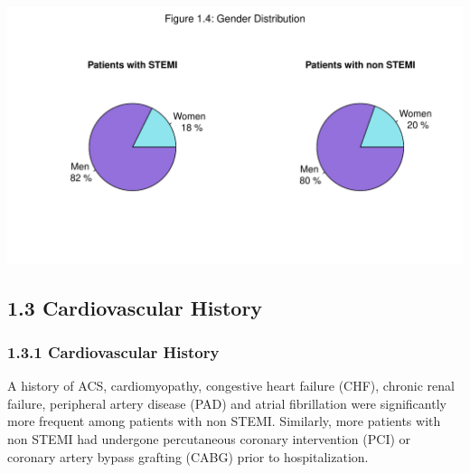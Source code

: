 \documentclass[
]{article}
\begin{document}
~

~

\includegraphics{‏‏ACSIS_2024_v1_with_trend_pdf_files/figure-latex/unnamed-chunk-17-1.pdf}

\pagebreak

\subsection{1.3 Cardiovascular History}\label{cardiovascular-history}

\subsubsection{1.3.1 Cardiovascular
History}\label{cardiovascular-history-1}

A history of ACS, cardiomyopathy, congestive heart failure (CHF),
chronic renal failure, peripheral artery disease (PAD) and atrial
fibrillation were significantly more frequent among patients with non
STEMI. Similarly, more patients with non STEMI had undergone
percutaneous coronary intervention (PCI) or coronary artery bypass
grafting (CABG) prior to hospitalization.

~
\end{document}
